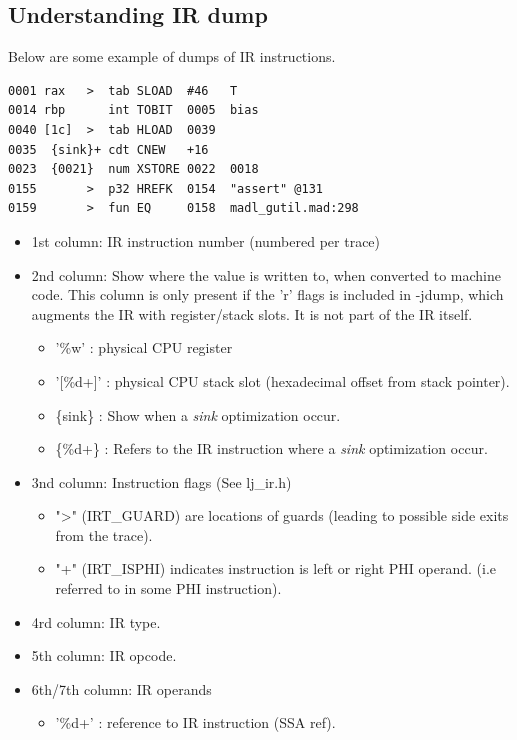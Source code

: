 \subsection{Understanding IR dump}
\label{Subsec:dump-ir}

Below are some example of dumps of IR instructions.
\begin{verbatim}
0001 rax   >  tab SLOAD  #46   T
0014 rbp      int TOBIT  0005  bias
0040 [1c]  >  tab HLOAD  0039
0035  {sink}+ cdt CNEW   +16
0023  {0021}  num XSTORE 0022  0018
0155       >  p32 HREFK  0154  "assert" @131
0159       >  fun EQ     0158  madl_gutil.mad:298
\end{verbatim}

\begin{itemize}
  \item 1st column: IR instruction number (numbered per trace)
  \item 2nd column: Show where the value is written to, when converted to machine
    code. This column is only present if the 'r' flags is included in -jdump,
    which augments the IR with register/stack slots. It is not part of the IR
    itself.
    \begin{itemize}
      \item '\%w' : physical CPU register
      \item '[\%d+]' : physical CPU stack slot (hexadecimal offset from stack pointer).
      \item \{sink\} : Show when a \emph{sink} optimization occur.
      \item \{\%d+\} : Refers to the IR instruction where a \emph{sink}
        optimization occur.
    \end{itemize}
  \item 3nd column: Instruction flags (See lj\_ir.h)
  \begin{itemize}
    \item "\textgreater" (IRT\_GUARD) are locations of
        guards (leading to possible side exits from the trace).
    \item "+" (IRT\_ISPHI) indicates
        instruction is left or right PHI operand. (i.e referred
        to in some PHI instruction).
  \end{itemize}
  \item 4rd column: IR type.
  \item 5th column: IR opcode.
  \item 6th/7th column: IR operands
    \begin{itemize}
      \item '\%d+' : reference to IR instruction (SSA ref).

\end{itemize}
\end{itemize}
